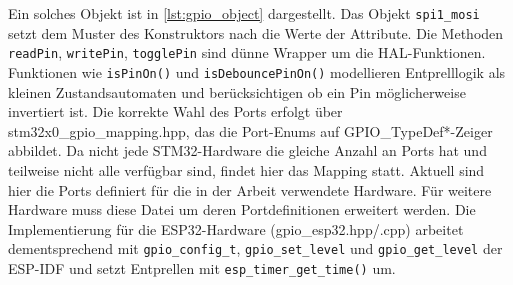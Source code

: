 Ein solches Objekt ist in \cref{lst:gpio_object} dargestellt.
Das Objekt \texttt{spi1\_mosi} setzt dem Muster des Konstruktors nach die Werte der Attribute.
Die Methoden \texttt{readPin}, \texttt{writePin}, \texttt{togglePin} sind dünne Wrapper um die HAL-Funktionen.
Funktionen wie \texttt{isPinOn()} und \texttt{isDebouncePinOn()} modellieren Entprelllogik als kleinen Zustandsautomaten und berücksichtigen ob ein Pin möglicherweise invertiert ist.
Die korrekte Wahl des Ports erfolgt über stm32x0\_gpio\_mapping.hpp, das die Port-Enums auf GPIO\_TypeDef*-Zeiger abbildet.
Da nicht jede STM32-Hardware die gleiche Anzahl an Ports hat und teilweise nicht alle verfügbar sind, findet hier das Mapping statt.
Aktuell sind hier die Ports definiert für die in der Arbeit verwendete Hardware.
Für weitere Hardware muss diese Datei um deren Portdefinitionen erweitert werden.
Die Implementierung für die ESP32-Hardware (gpio\_esp32.hpp/.cpp) arbeitet dementsprechend mit \texttt{gpio\_config\_t}, \texttt{gpio\_set\_level} und \texttt{gpio\_get\_level} der ESP-IDF und setzt Entprellen mit \texttt{esp\_timer\_get\_time()} um.

